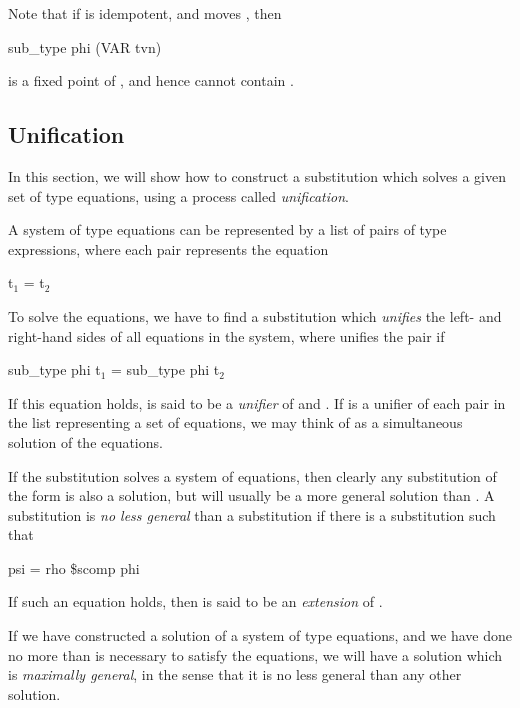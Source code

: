 Note that if  is idempotent, and  moves , then
\begin{mlcoded}
sub\_type phi (VAR tvn)
\end{mlcoded}
is a fixed point of , and hence cannot contain .

\subsection{Unification}
In this section, we will show how to construct a substitution which solves a
given set of type equations, using a process called \textit{unification}.

A system of type equations can be represented by a list of pairs of type
expressions, where each pair  represents the equation
\begin{mlcoded}
t$_1$ = t$_2$
\end{mlcoded}
To solve the equations, we have to find a substitution  which \textit{unifies} the left-
and right-hand sides of all equations in the system, where  unifies the pair
 if
\begin{mlcoded}
    sub\_type phi t$_1$ = sub\_type phi t$_2$
\end{mlcoded}
If this equation holds,  is said to be a \textit{unifier} of  and . If  is a unifier of
each pair in the list representing a set of equations, we may think of  as
a simultaneous solution of the equations.

If the substitution  solves a system of equations, then clearly any
substitution  of the form  is also a solution, but  will
usually be a more general solution than . A substitution  is \textit{no less
general} than a substitution  if there is a substitution  such that
\begin{mlcoded}
    psi = rho \$scomp phi
\end{mlcoded}
If such an equation holds, then  is said to be an \textit{extension} of .

If we have constructed a solution  of a system of type equations, and we
have done no more than is necessary to satisfy the equations, we will have a
solution which is \textit{maximally general}, in the sense that it is no less general than
any other solution.

